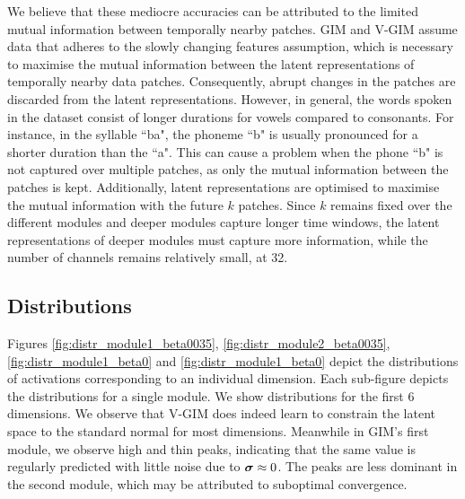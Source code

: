 	We believe that these mediocre accuracies can be attributed to the limited mutual information between temporally nearby patches. GIM and V-GIM assume data that adheres to the slowly changing features assumption, which is necessary to maximise the mutual information between the latent representations of temporally nearby data patches. Consequently, abrupt changes in the patches are discarded from the latent representations. 
	However, in general, the words spoken in the dataset consist of longer durations for vowels compared to consonants. For instance, in the syllable ``ba", the phoneme ``b" is usually pronounced for a shorter duration than the ``a". This can cause a problem when the phone ``b" is not captured over multiple patches, as only the mutual information between the patches is kept. Additionally, latent representations are optimised to maximise the mutual information with the future $k$ patches. Since $k$ remains fixed over the different modules and deeper modules capture longer time windows, the latent representations of deeper modules must capture more information, while the number of channels remains relatively small, at 32.
	
				
	\subsection{Distributions}
		Figures \ref{fig:distr_module1_beta0035}, \ref{fig:distr_module2_beta0035}, \ref{fig:distr_module1_beta0} and \ref{fig:distr_module1_beta0} depict the distributions of activations corresponding to an individual dimension. Each sub-figure depicts the distributions for a single module. We show distributions for the first 6 dimensions. We observe that V-GIM does indeed learn to constrain the latent space to the standard normal for most dimensions. Meanwhile in GIM's first module, we observe high and thin peaks, indicating that the same value is regularly predicted with little noise due to $\bm{\sigma} \approx 0$. The peaks are less dominant in the second module, which may be attributed to suboptimal convergence.
		

		


